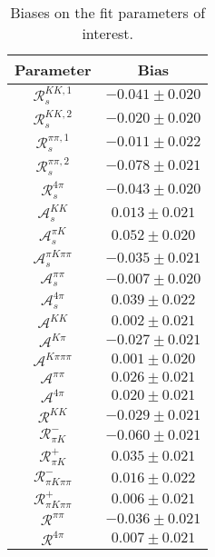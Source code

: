 \begin{table}
  \centering
  \small
  \begin{tabular}{cc}
  \toprule
      Parameter & Bias \\
  \midrule
      $\mathcal{R}_{s}^{KK,1}$ & $-0.041 \pm 0.020$ \\
      $\mathcal{R}_{s}^{KK,2}$ & $-0.020 \pm 0.020$ \\
      $\mathcal{R}_{s}^{\pi\pi,1}$ & $-0.011 \pm 0.022$ \\
      $\mathcal{R}_{s}^{\pi\pi,2}$ & $-0.078 \pm 0.021$ \\
      $\mathcal{R}_{s}^{4\pi}$ & $-0.043 \pm 0.020$ \\
      $\mathcal{A}_s^{KK}$ & $0.013 \pm 0.021$ \\
      $\mathcal{A}_s^{\pi K}$ & $0.052 \pm 0.020$ \\
      $\mathcal{A}_s^{\pi K\pi\pi}$ & $-0.035 \pm 0.021$ \\
      $\mathcal{A}_s^{\pi\pi}$ & $-0.007 \pm 0.020$ \\
      $\mathcal{A}_s^{4\pi}$ & $0.039 \pm 0.022$ \\
      $\mathcal{A}^{KK}$ & $0.002 \pm 0.021$ \\
      $\mathcal{A}^{K\pi}$ & $-0.027 \pm 0.021$ \\
      $\mathcal{A}^{K\pi\pi\pi}$ & $0.001 \pm 0.020$ \\
      $\mathcal{A}^{\pi\pi}$ & $0.026 \pm 0.021$ \\
      $\mathcal{A}^{4\pi}$ & $0.020 \pm 0.021$ \\
      $\mathcal{R}^{KK}$ & $-0.029 \pm 0.021$ \\
      $\mathcal{R}_{\pi K}^-$ & $-0.060 \pm 0.021$ \\
      $\mathcal{R}_{\pi K}^+$ & $0.035 \pm 0.021$ \\
      $\mathcal{R}_{\pi K\pi\pi}^-$ & $0.016 \pm 0.022$ \\
      $\mathcal{R}_{\pi K\pi\pi}^+$ & $0.006 \pm 0.021$ \\
      $\mathcal{R}^{\pi\pi}$ & $-0.036 \pm 0.021$ \\
      $\mathcal{R}^{4\pi}$ & $0.007 \pm 0.021$ \\
      \bottomrule
  \end{tabular}
  \caption{Biases on the fit parameters of interest.}
\label{tab:biases}
\end{table}
